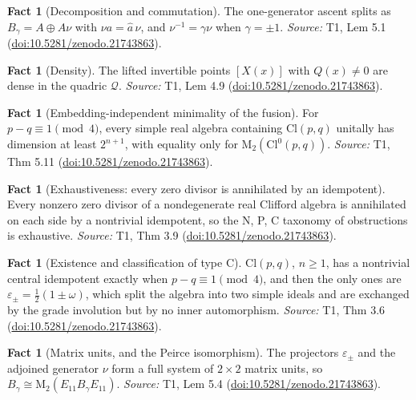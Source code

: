 \documentclass[11pt]{article}
\theoremstyle{definition}
\newtheorem{fact}[theorem]{Fact}
\theoremstyle{plain}
\providecommand{\Cl}{}\renewcommand{\Cl}{\mathrm{Cl}}
\providecommand{\Mat}{}\renewcommand{\Mat}{\mathrm{M}}
\begin{document}
\begin{fact}[Decomposition and commutation]\label{c:transport.decomposition-commutation}
The one-generator ascent splits as $B_\gamma = A \oplus A\nu$ with $\nu a = \hat a\, \nu$, and $\nu^{-1} = \gamma\nu$ when $\gamma = \pm 1$.
\emph{Source:} T1, Lem 5.1 (\href{https://doi.org/10.5281/zenodo.21743863}{doi:10.5281/zenodo.21743863}).
\end{fact}

\begin{fact}[Density]\label{c:transport.density}
The lifted invertible points $[X(x)]$ with $Q(x) \neq 0$ are dense in the quadric $\mathcal{Q}$.
\emph{Source:} T1, Lem 4.9 (\href{https://doi.org/10.5281/zenodo.21743863}{doi:10.5281/zenodo.21743863}).
\end{fact}

\begin{fact}[Embedding-independent minimality of the fusion]\label{c:transport.embedding-independent-minimality-fusion}
For $p - q \equiv 1 \pmod 4$, every simple real algebra containing $\Cl(p,q)$ unitally has dimension at least $2^{n+1}$, with equality only for $\Mat_2(\Cl^0(p,q))$.
\emph{Source:} T1, Thm 5.11 (\href{https://doi.org/10.5281/zenodo.21743863}{doi:10.5281/zenodo.21743863}).
\end{fact}

\begin{fact}[Exhaustiveness: every zero divisor is annihilated by an idempotent]\label{c:transport.exhaustiveness-every-zero-divisor-annihilated-idempotent}
Every nonzero zero divisor of a nondegenerate real Clifford algebra is annihilated on each side by a nontrivial idempotent, so the N, P, C taxonomy of obstructions is exhaustive.
\emph{Source:} T1, Thm 3.9 (\href{https://doi.org/10.5281/zenodo.21743863}{doi:10.5281/zenodo.21743863}).
\end{fact}

\begin{fact}[Existence and classification of type C]\label{c:transport.existence-classification-type-c}
$\Cl(p,q)$, $n \geq 1$, has a nontrivial central idempotent exactly when $p - q \equiv 1 \pmod 4$, and then the only ones are $\varepsilon_\pm = \tfrac12(1 \pm \omega)$, which split the algebra into two simple ideals and are exchanged by the grade involution but by no inner automorphism.
\emph{Source:} T1, Thm 3.6 (\href{https://doi.org/10.5281/zenodo.21743863}{doi:10.5281/zenodo.21743863}).
\end{fact}

\begin{fact}[Matrix units, and the Peirce isomorphism]\label{c:transport.matrix-units-peirce-isomorphism}
The projectors $\varepsilon_\pm$ and the adjoined generator $\nu$ form a full system of $2 \times 2$ matrix units, so $B_\gamma \cong \Mat_2(E_{11} B_\gamma E_{11})$.
\emph{Source:} T1, Lem 5.4 (\href{https://doi.org/10.5281/zenodo.21743863}{doi:10.5281/zenodo.21743863}).
\end{fact}
\end{document}
